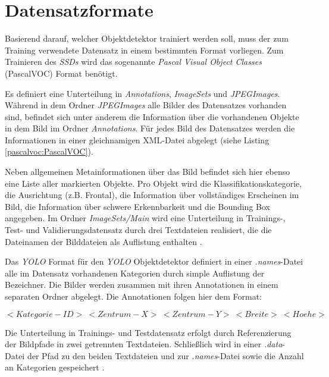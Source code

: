 \section{Datensatzformate}

Basierend darauf, welcher Objektdetektor trainiert werden soll, muss der zum Training verwendete Datensatz in einem bestimmten Format vorliegen. Zum Trainieren des \textit{SSDs} wird das sogenannte \textit{Pascal Visual Object Classes} (PascalVOC) Format benötigt. 

Es definiert eine Unterteilung in \textit{Annotations}, \textit{ImageSets} und \textit{JPEGImages}. Während in dem Ordner \textit{JPEGImages} alle Bilder des Datensatzes vorhanden sind, befindet sich unter anderem die Information über die vorhandenen Objekte in dem Bild im Ordner \textit{Annotations}. Für jedes Bild des Datensatzes werden die Informationen in einer gleichnamigen XML-Datei abgelegt (siehe Listing \ref{pascalvoc:PascalVOC}).

\lstset{language=XML}


Neben allgemeinen Metainformationen über das Bild befindet sich hier ebenso eine Liste aller markierten Objekte. Pro Objekt wird die Klassifikationskategorie, die Ausrichtung (z.B. \glqq Frontal\grqq{}), die Information über vollständiges Erscheinen im Bild, die Information über schwere Erkennbarkeit und die Bounding Box angegeben. Im Ordner \textit{ImageSets/Main} wird eine Unterteilung in Trainings-, Test- und Validierungsdatensatz durch drei Textdateien realisiert, die die Dateinamen der Bilddateien als Auflistung enthalten \cite{RenuKhandelwal.2019}. 

Das \textit{YOLO} Format für den \textit{YOLO} Objektdetektor definiert in einer \textit{.names}-Datei alle im Datensatz vorhandenen Kategorien durch simple Auflistung der Bezeichner. Die Bilder werden zusammen mit ihren Annotationen in einem separaten Ordner abgelegt. Die Annotationen folgen hier dem Format:

$<Kategorie-ID>\:<Zentrum-X>\:<Zentrum-Y>\:<Breite>\:<Hoehe>$

Die Unterteilung in Trainings- und Testdatensatz erfolgt durch Referenzierung der Bildpfade in zwei getrennten Textdateien. Schließlich wird in einer \textit{.data}-Datei der Pfad zu den beiden Textdateien und zur \textit{.names}-Datei sowie die Anzahl an Kategorien gespeichert \cite{ArunPonnusamy.20191006}.